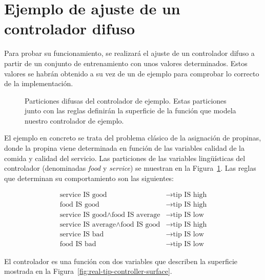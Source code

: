 \section{Ejemplo de ajuste de un controlador difuso}

Para probar su funcionamiento, se realizará el ajuste de un controlador difuso a partir de un conjunto de entrenamiento con unos valores determinados. Estos valores se habrán obtenido a su vez de un  de ejemplo para comprobar lo correcto de la implementación.

\begin{figure}[t]
	\centering
	\qquad
	\caption[Particiones difusas del controlador de ejemplo]{Particiones difusas del controlador de ejemplo. Estas particiones junto con las reglas definirán la superficie de la función que modela nuestro controlador de ejemplo.}
	\label{fig:real-tip-controller-vars}
\end{figure}


El ejemplo en concreto se trata del problema clásico de la asignación de propinas, donde la propina viene determinada en función de las variables calidad de la comida y calidad del servicio. Las particiones de las variables lingüísticas del controlador (denominadas \textit{food} y \textit{service}) se muestran en la Figura~\ref{fig:real-tip-controller-vars}. Las reglas que determinan su comportamiento son las siguientes:

\begin{align}
	\text{service IS good}                              &\rightarrow \text{tip IS high}\nonumber\\
	\text{food IS good}                                 &\rightarrow \text{tip IS high}\nonumber\\
	\text{service IS good} \land \text{food IS average} &\rightarrow \text{tip IS low}\nonumber\\
	\text{service IS average} \land \text{food IS good} &\rightarrow \text{tip IS high}\nonumber\\
	\text{service IS bad}                               &\rightarrow \text{tip IS low}\nonumber\\
	\text{food IS bad}                                  &\rightarrow \text{tip IS low}
\end{align}

El controlador es una función con dos variables que describen la superficie mostrada en la Figura~\ref{fig:real-tip-controller-surface}.

